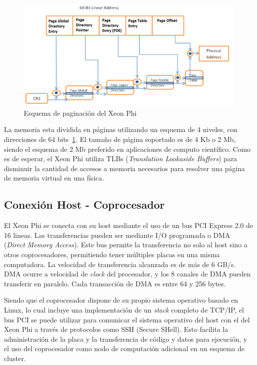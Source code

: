 \begin{figure}[htbp]
   \centering
   \includegraphics[width=\plotwidth]{images/xeon-phi-addressing.png}
   \caption{Esquema de paginaci\'on del Xeon Phi}
   \label{fig::xeon_phi_addressing}
\end{figure}

La memoria esta dividida en p\'aginas utilizando un esquema de 4 niveles, con direcciones de 64 bits~\ref{fig::xeon_phi_addressing}. El tama\~no de p\'agina soportado es de 4 Kb
o 2 Mb, siendo el esquema de 2 Mb preferido en aplicaciones de computo cient\'ifico. Como es de esperar, el Xeon Phi utiliza TLBs (\textit{Translation Lookaside
Buffers}) para disminuir la cantidad de accesos a memoria necesarios para resolver una p\'agina de memoria virtual en una f\'isica.

\subsection{Conexi\'on Host - Coprocesador}

El Xeon Phi se conecta con su host mediante el uso de un bus PCI Express 2.0 de 16 lineas. Las transferencias pueden ser
mediante I/O programada o DMA (\textit{Direct Memory Access}). Este bus permite la transferencia no solo al host sino a
otros coprocesadores, permitiendo tener m\'ultiples placas en una misma computadora. La velocidad de transferencia alcanzada
es de m\'as de 6 GB/s. DMA ocurre a velocidad de \textit{clock} del procesador, y los 8 canales de DMA pueden transferir
en paralelo. Cada transacci\'on de DMA es entre 64 y 256 bytes.

Siendo que el coprocesador dispone de su propio sistema operativo basado en Linux, lo cual incluye una implementaci\'on
de un \textit{stack} completo de TCP/IP, el bus PCI se puede utilizar para comunicar el sistema operativo del host con
el del Xeon Phi a trav\'es de protocolos como SSH (Secure SHell). Esto facilita la administraci\'on de la placa y la
transferencia de c\'odigo y datos para ejecuci\'on, y el uso del coprocesador como nodo de computaci\'on adicional en un
esquema de cluster.

